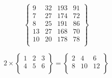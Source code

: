 \documentclass[UTF8,12pt]{ctexart}
\begin{document}
{\color{white} \LARGE
$$
\left\{
 \begin{matrix}
   9 & 32 & 193 & 91\\
   7 & 27 & 174 & 72\\
   8 & 25 & 191 & 86\\
   13 & 27 & 168 & 70\\
   10 & 20 & 178 & 78\\
  \end{matrix}
  \right\} 
$$
 }


{\color{white} 
$$
2 \times \left\{
 \begin{matrix}
   1 & 2 & 3\\
   4 & 5 & 6\\
  \end{matrix}
  \right\}=\left\{
 \begin{matrix}
   2 & 4 & 6\\
   8 & 10 & 12\\
  \end{matrix}
  \right\}
$$
 }
\end{document}
